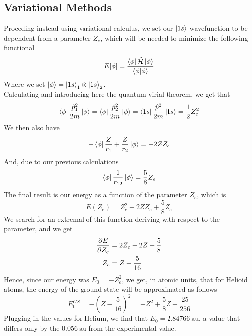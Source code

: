 \documentclass[../qm.tex]{subfiles}
\begin{document}
	\subsection{Variational Methods}
	Proceding instead using variational calculus, we set our $\ket{1s}$ wavefunction to be dependent from a parameter $Z_e$, which will be needed to minimize the following functional
	\begin{equation}
		E[\phi]=\frac{\bra{\phi}\hat{\mathcal{H}}\ket{\phi}}{\braket{\phi}}
		\label{eq:phiwavefunction}
	\end{equation}
	Where we set $\ket{\phi}=\ket{1s}_1\otimes\ket{1s}_2$.\\
	Calculating and introducing here the quantum virial theorem, we get that
	\begin{equation}
		\bra{\phi}\frac{\hat{p}^2_1}{2m}\ket{\phi}=\bra{\phi}\frac{\hat{p}^2_2}{2m}\ket{\phi}=\bra{1s}\frac{\hat{p}^2}{2m}\ket{1s}=\frac{1}{2}Z_e^2
		\label{eq:expectedvalueheliumelectrons}
	\end{equation}
	We then also have
	\begin{equation}
		-\bra{\phi}\frac{Z}{r_1}+\frac{Z}{r_2}\ket{\phi}=-2ZZ_e
		\label{eq:potentialexpval}
	\end{equation}
	And, due to our previous calculations
	\begin{equation}
		\bra{\phi}\frac{1}{r_{12}}\ket{\phi}=\frac{5}{8}Z_e
		\label{eq:r12expval}
	\end{equation}
	The final result is our energy as a function of the parameter $Z_e$, which is
	\begin{equation}
		E(Z_e)=Z_e^2-2ZZ_e+\frac{5}{8}Z_e
		\label{eq:heliumenergyparameter}
	\end{equation}
	We search for an extremal of this function deriving with respect to the parameter, and we get
	\begin{equation}
		\begin{aligned}
			\pdv{E}{Z_e}&=2Z_e-2Z+\frac{5}{8}\\
			Z_e&=Z-\frac{5}{16}
		\end{aligned}
		\label{eq:parametervalue}
	\end{equation}
	Hence, since our energy was $E_0=-Z_e^2$, we get, in atomic units, that for Helioid atoms, the energy of the ground state will be approximated as follows
	\begin{equation}
		E_0^{GS}=-\left( Z-\frac{5}{16} \right)^2=-Z^2+\frac{5}{8}Z-\frac{25}{256}
		\label{eq:heliumgsfinal}
	\end{equation}
	Plugging in the values for Helium, we find that $E_0=2.84766\ \mathrm{au}$, a value that differs only by the $0.056\ \mathrm{au}$ from the experimental value.\\
\end{document}
